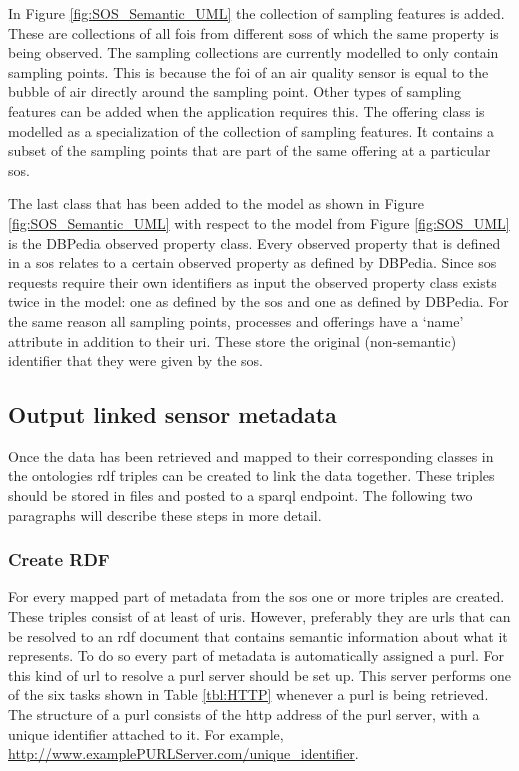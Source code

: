 In Figure \ref{fig:SOS_Semantic_UML} the collection of sampling features is added. These are collections of all \acp{foi} from different \aclp{sos} of which the same property is being observed. The sampling collections are currently modelled to only contain sampling points. This is because the \ac{foi} of an air quality sensor is equal to the bubble of air directly around the sampling point. Other types of sampling features can be added when the application requires this. The offering class is modelled as a specialization of the collection of sampling features. It contains a subset of the sampling points that are part of the same offering at a particular \ac{sos}.

The last class that has been added to the model as shown in Figure \ref{fig:SOS_Semantic_UML} with respect to the model from Figure \ref{fig:SOS_UML} is the DBPedia observed property class. Every observed property that is defined in a \ac{sos} relates to a certain observed property as defined by DBPedia. Since \ac{sos} requests require their own identifiers as input the observed property class exists twice in the model: one as defined by the \ac{sos} and one as defined by DBPedia. For the same reason all sampling points, processes and offerings have a `name' attribute in addition to their \ac{uri}. These store the original (non-semantic) identifier that they were given by the \ac{sos}. 

\subsection{Output linked sensor metadata}
\label{par:publishLD}

Once the data has been retrieved and mapped to their corresponding classes in the ontologies \ac{rdf} triples can be created to link the data together. These triples should be stored in files and posted to a \ac{sparql} endpoint. The following two paragraphs will describe these steps in more detail.


\subsubsection{Create RDF}
\label{par:createRDF}
For every mapped part of metadata from the \ac{sos} one or more triples are created. These triples consist of at least of \acp{uri}. However, preferably they are \acp{url} that can be resolved to an \ac{rdf} document that contains semantic information about what it represents. To do so every part of metadata is automatically assigned a \acf{purl}. For this kind of \ac{url} to resolve a \ac{purl} server should be set up. This server performs one of the six tasks shown in Table \ref{tbl:HTTP} whenever a \ac{purl} is being retrieved. The structure of a \ac{purl} consists of the \ac{http} address of the \ac{purl} server, with a unique identifier attached to it. For example, \url{http://www.examplePURLServer.com/unique\_identifier}. 

